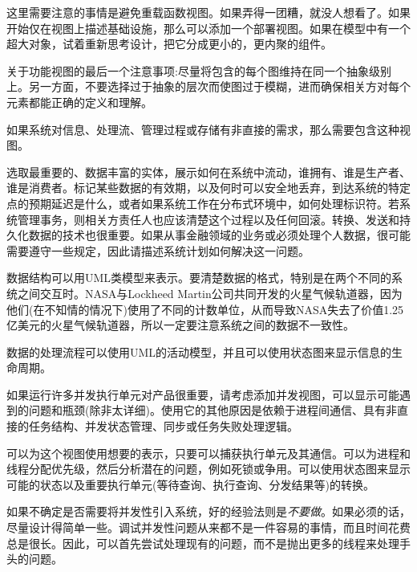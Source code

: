 \begin{tcolorbox}[colback=webgreen!5!white,colframe=webgreen!75!black, title=TIP]
\hspace*{0.75cm}这里需要注意的事情是避免重载函数视图。如果弄得一团糟，就没人想看了。如果开始仅在视图上描述基础设施，那么可以添加一个部署视图。如果在模型中有一个超大对象，试着重新思考设计，把它分成更小的，更内聚的组件。
\end{tcolorbox}

关于功能视图的最后一个注意事项:尽量将包含的每个图维持在同一个抽象级别上。另一方面，不要选择过于抽象的层次而使图过于模糊，进而确保相关方对每个元素都能正确的定义和理解。


如果系统对信息、处理流、管理过程或存储有非直接的需求，那么需要包含这种视图。

选取最重要的、数据丰富的实体，展示如何在系统中流动，谁拥有、谁是生产者、谁是消费者。标记某些数据的有效期，以及何时可以安全地丢弃，到达系统的特定点的预期延迟是什么，或者如果系统工作在分布式环境中，如何处理标识符。若系统管理事务，则相关方责任人也应该清楚这个过程以及任何回滚。转换、发送和持久化数据的技术也很重要。如果从事金融领域的业务或必须处理个人数据，很可能需要遵守一些规定，因此请描述系统计划如何解决这一问题。

数据结构可以用UML类模型来表示。要清楚数据的格式，特别是在两个不同的系统之间交互时。NASA与Lockheed Martin公司共同开发的火星气候轨道器，因为他们(在不知情的情况下)使用了不同的计数单位，从而导致NASA失去了价值1.25亿美元的火星气候轨道器，所以一定要注意系统之间的数据不一致性。

数据的处理流程可以使用UML的活动模型，并且可以使用状态图来显示信息的生命周期。


如果运行许多并发执行单元对产品很重要，请考虑添加并发视图，可以显示可能遇到的问题和瓶颈(除非太详细)。使用它的其他原因是依赖于进程间通信、具有非直接的任务结构、并发状态管理、同步或任务失败处理逻辑。

可以为这个视图使用想要的表示，只要可以捕获执行单元及其通信。可以为进程和线程分配优先级，然后分析潜在的问题，例如死锁或争用。可以使用状态图来显示可能的状态以及重要执行单元(等待查询、执行查询、分发结果等)的转换。

如果不确定是否需要将并发性引入系统，好的经验法则是\textit{不要做}。如果必须的话，尽量设计得简单一些。调试并发性问题从来都不是一件容易的事情，而且时间花费总是很长。因此，可以首先尝试处理现有的问题，而不是抛出更多的线程来处理手头的问题。

